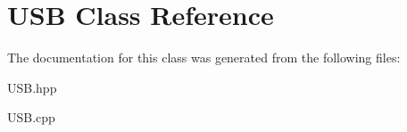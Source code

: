 \hypertarget{class_u_s_b}{}\section{U\+SB Class Reference}
\label{class_u_s_b}


The documentation for this class was generated from the following files\+:\begin{DoxyCompactItemize}
\item 
U\+S\+B.\+hpp\item 
U\+S\+B.\+cpp\end{DoxyCompactItemize}
